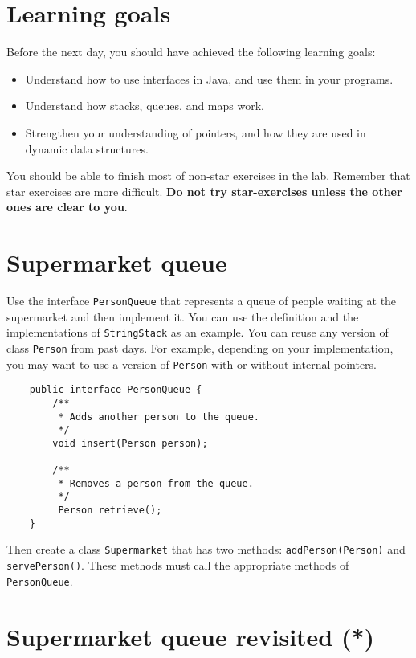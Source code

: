 \documentclass{article}
\begin{document}
\section*{Learning goals}
\label{sec:learning-goals}

Before the next day, you should have achieved the following learning
goals: 

\begin{itemize}
\item Understand how to use interfaces in Java, and use them in your
  programs. 
\item Understand how stacks, queues, and maps work. 
\item Strengthen your understanding of pointers, and how they are used
  in dynamic data structures. 
\end{itemize}

You should be able to finish most of non-star exercises in the lab. 
Remember that star exercises are more difficult. 
\textbf{Do not try star-exercises unless the other ones are clear to
  you}.  

\section{Supermarket queue}
\label{sec:queues}

Use the interface \verb+PersonQueue+ that represents a queue of
people waiting at the supermarket and then implement it. You can use
the definition and the implementations of \verb+StringStack+ as an
example. You can reuse any version of class \verb+Person+ from past
days. For example, depending on your implementation, you may want to
use a version of \verb+Person+ with or without internal pointers. 

\begin{verbatim}
    public interface PersonQueue {
        /**
         * Adds another person to the queue.
         */
        void insert(Person person);

        /**
         * Removes a person from the queue.
         */ 
         Person retrieve();
    }
\end{verbatim}

Then create a class \verb+Supermarket+ that has two methods:
\verb+addPerson(Person)+ and \verb+servePerson()+. These methods must
call the appropriate methods of \verb+PersonQueue+. 

\section{Supermarket queue revisited (*)}
\label{sec:superm-queue-revis}
\end{document}
